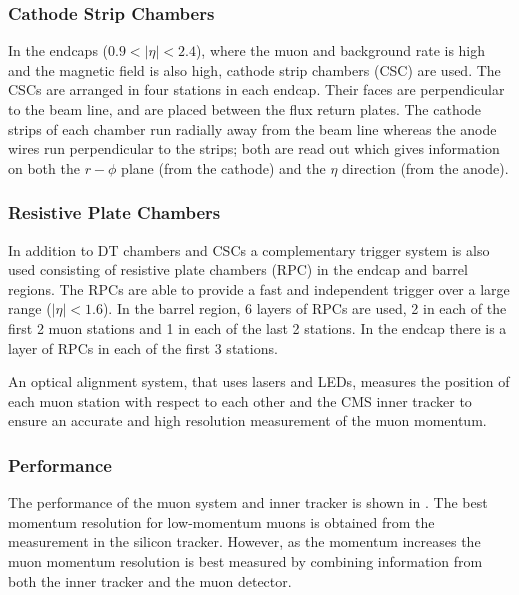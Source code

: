 \subsubsection{Cathode Strip Chambers}
In the endcaps ($0.9<|\eta|<2.4$), where the muon and background rate is high and
the magnetic field is also high,
cathode strip chambers (CSC) are used. The
CSCs are arranged in four stations in each endcap. Their faces are perpendicular
to the beam line, and are placed between the flux return plates.  The cathode
strips of each chamber run radially away from the beam line whereas the anode
wires run perpendicular to the strips; both are read out which gives information
on both the $r-\phi$ plane (from the cathode) and the $\eta$ direction (from the
anode). \cite{chatrchyan2008cms}

\subsubsection{Resistive Plate Chambers}
In addition to DT chambers and CSCs a complementary trigger system is also used
consisting of resistive plate chambers (RPC) in the endcap and barrel regions.
The RPCs are able to provide a fast and independent trigger over a large range
($|\eta| < 1.6$). In the barrel region, 6 layers of RPCs are used, 2 in each of
the first 2 muon stations and 1 in each of the last 2 stations. In the endcap
there is a layer of RPCs in each of the first 3 stations.

An optical alignment system, that uses lasers and LEDs, measures the position
of each muon station with respect to each other and the CMS inner tracker to
ensure an accurate and high resolution measurement of the muon
momentum.\cite{chatrchyan2008cms}

\subsubsection{Performance}
The performance of the muon system and inner tracker is shown in 
. The best momentum resolution for low-momentum muons
is obtained from the measurement in the silicon tracker. However, as the momentum
increases the muon momentum resolution is best measured by combining information
from both the inner tracker and the muon detector.

